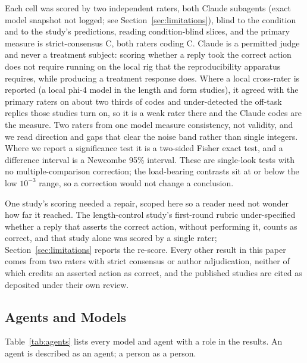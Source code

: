 \documentclass[11pt,a4paper]{article}
\begin{document}
Each cell was scored by two independent raters, both Claude subagents (exact model
snapshot not logged; see Section~\ref{sec:limitations}), blind to the
condition and to the study's predictions, reading condition-blind slices, and the
primary measure is strict-consensus C, both raters coding C. Claude is a permitted
judge and never a treatment subject: scoring whether a reply took the correct action
does not require running on the local rig that the reproducibility apparatus requires,
while producing a treatment response does. Where a local cross-rater is reported (a
local phi-4 model in the length and form studies), it agreed with the primary raters on
about two thirds of codes and under-detected the off-task replies those studies turn on,
so it is a weak rater there and the Claude codes are the measure. Two raters from one
model measure consistency, not validity, and
we read direction and gaps that clear the noise band rather than single integers. Where
we report a significance test it is a two-sided Fisher exact test, and a difference
interval is a Newcombe 95\% interval. These are single-look tests with no
multiple-comparison correction; the load-bearing contrasts sit at or below the low
$10^{-3}$ range, so a correction would not change a conclusion.

One study's scoring needed a repair, scoped here so a reader need not wonder how far it
reached. The length-control study's first-round rubric under-specified whether a reply
that asserts the correct action, without performing it, counts as correct, and that study
alone was scored by a single rater; Section~\ref{sec:limitations} reports the re-score.
Every other result in this paper comes from two raters with strict consensus or author
adjudication, neither of which credits an asserted action as correct, and the published
studies are cited as deposited under their own review.

\subsection{Agents and Models}\label{sec:agents}

Table~\ref{tab:agents} lists every model and agent with a role in the results. An agent
is described as an agent; a person as a person.
\end{document}
